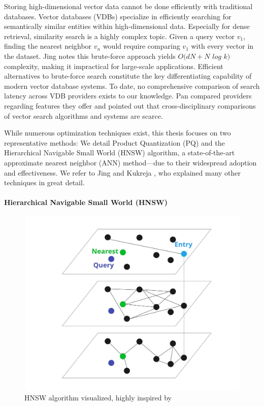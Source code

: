 Storing high-dimensional vector data cannot be done efficiently with traditional databases. Vector databases (VDBs) specialize in efficiently searching for semantically similar entities within high-dimensional data. Especially for dense retrieval, similarity search is a highly complex topic. Given a query vector $v_1$, finding the nearest neighbor $v_{n}$ would require comparing $v_1$ with every vector in the dataset. Jing \cite{Jing.2024} notes this brute-force approach yields $O(dN+N$ $log$ $k)$ complexity, making it impractical for large-scale applications. Efficient alternatives to brute-force search constitute the key differentiating capability of modern vector database systems. To date, no comprehensive comparison of search latency across VDB providers exists to our knowledge. Pan \cite{Pan.2024} compared providers regarding features they offer and pointed out that cross-disciplinary comparisons of vector search algorithms and systems are scarce.

While numerous optimization techniques exist, this thesis focuses on two representative methods: We detail Product Quantization (PQ) and the Hierarchical Navigable Small World (HNSW) algorithm, a state-of-the-art approximate nearest neighbor (ANN) method—due to their widespread adoption and effectiveness. We refer to Jing \cite{Jing.2024} and Kukreja \cite{Kukreja.2023}, who explained many other techniques in great detail.

\paragraph{Hierarchical Navigable Small World (HNSW)}

\begin{figure}[h!]
    \centering
    \includegraphics[width=\textwidth]{images/HNSW.jpg}
    \caption{HNSW algorithm visualized, highly inspired by \cite{Pinecone.22.01.2025}}
    \label{fig:HNSW}
\end{figure}

